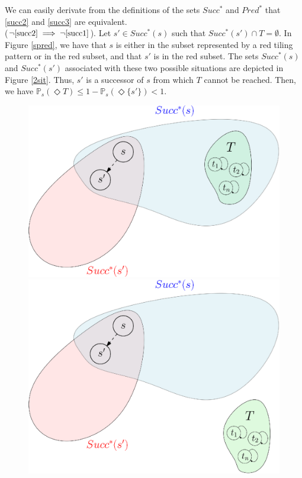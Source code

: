 \begin{proof2}\cite{PMC}
We can easily derivate from the definitions of the sets $Succ^*$ and $Pred^*$ that \ref{succ2} and \ref{succ3} are equivalent. \\
($\neg\ref{succ2}\implies\neg\ref{succ1}$). Let $s' \in Succ^*(s)$ such that $Succ^*(s') \cap T = \emptyset$. In Figure \ref{spred}, we have that $s$ is either in the subset represented by a red tiling pattern or in the red subset, and that $s'$ is in the red subset.
The sets $Succ^*(s)$ and $Succ^*(s')$ associated with these two possible situations are depicted in Figure \ref{2sit}.
Thus, $s'$ is a successor of $s$ from which $T$ cannot be reached. Then, we have $\mathbb{P}_s(\Diamond T) \leq 1 - \mathbb{P}_s(\Diamond \{s'\}) < 1$.
\begin{figure}[H]
  \begin{minipage}{0.5\linewidth}
    \centering
    \includegraphics[width=0.8\linewidth]{resources/S3BSCC}
  \end{minipage}
  \begin{minipage}{0.5\linewidth}
    \centering
    \includegraphics[width=0.8\linewidth]{resources/S4BSCC}

\end{minipage}
\end{figure}
\end{proof2}
